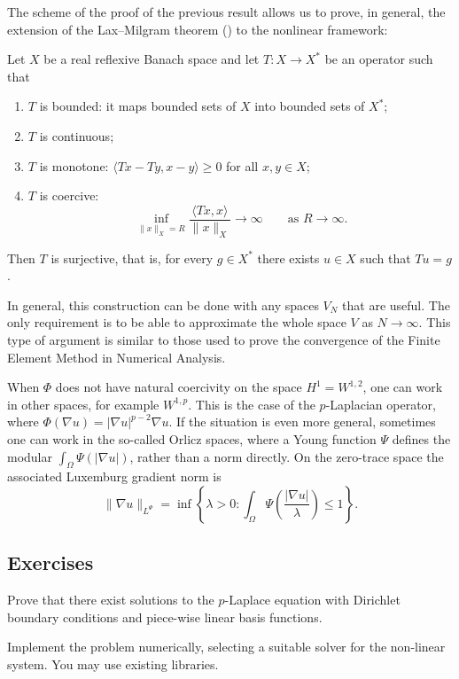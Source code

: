 The scheme of the proof of the previous result allows us to prove, in general, the extension of the Lax--Milgram theorem () to the nonlinear framework:
\begin{strongtheorem}
    \label{thm:Browder-Minty}
    Let $X$ be a real reflexive Banach space and let $T : X \to X^*$ be an operator such that
    \begin{enumerate}
        \item $T$ is bounded: it maps bounded sets of $X$ into bounded sets of $X^*$;
        \item $T$ is continuous;
        \item $T$ is monotone: $\langle Tx - Ty, x - y \rangle \ge 0$ for all $x, y \in X$;
        \item $T$ is coercive:
              \begin{equation*}
                  \inf_{\|x\|_X = R} \frac{\langle Tx, x \rangle}{\|x\|_X} \longrightarrow \infty \qquad \text{as } R \to \infty.
              \end{equation*}
    \end{enumerate}
    Then $T$ is surjective, that is, for every $g \in X^*$ there exists $u \in X$ such that $Tu = g$.
\end{strongtheorem}


\begin{remark}
    In general, this construction can be done with any spaces $V_N$ that are useful. The only requirement is to be able to approximate the whole space $V$ as $N \to \infty$. This type of argument is similar to those used to prove the convergence of the Finite Element Method in Numerical Analysis.
\end{remark}


\begin{remark}
    When $\Phi$ does not have natural coercivity on the space $H^1 = W^{1,2}$, one can work in other spaces, for example $W^{1,p}$. This is the case of the $p$-Laplacian operator, where $\Phi(\nabla u) = |\nabla u|^{p-2} \nabla u$. If the situation is even more general, sometimes one can work in the so-called Orlicz spaces, where a Young function $\Psi$ defines the modular $\int_\Omega\Psi(|\nabla u|)$, rather than a norm directly. On the zero-trace space the associated Luxemburg gradient norm is
    \begin{equation*}
        \|\nabla u\|_{L^\Psi}=\inf\left\{\lambda>0:\int_\Omega\Psi\left(\frac{|\nabla u|}{\lambda}\right)\le1\right\}.
    \end{equation*}
\end{remark}

\subsection*{Exercises}
\begin{exercises}
\ex Prove that there exist solutions to the $p$-Laplace equation with Dirichlet boundary conditions and piece-wise linear basis functions. 

\ex Implement the problem numerically, selecting a suitable solver for the non-linear system. You may use existing libraries.
\end{exercises}
